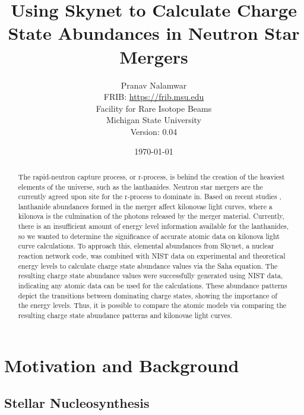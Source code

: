 \documentclass[11pt,a4paper]{article}
\begin{document}
\title{Using Skynet to Calculate Charge State Abundances in Neutron Star Mergers}

\author{Pranav Nalamwar\\FRIB: \url{https://frib.msu.edu}\\Facility for Rare Isotope Beams\\Michigan State University\\Version: 0.04} 
\date{\today}
\maketitle

\begin{abstract}

The rapid-neutron capture process, or r-process, is behind the creation of the heaviest elements of the universe, such as the lanthanides. Neutron star mergers are the currently agreed upon site for the r-process to dominate in. Based on recent studies \cite{2017Natur.551...80K} , lanthanide abundances formed in the merger affect kilonovae light curves, where a kilonova is the culmination of the photons released by the merger material. Currently, there is an insufficient amount of energy level information available for the lanthanides, so we wanted to determine the significance of accurate atomic data on kilonova light curve calculations. To approach this, elemental abundances from Skynet, a nuclear reaction network code, was combined with NIST data on experimental and theoretical energy levels to calculate charge state abundance values via the Saha equation. The resulting charge state abundance values were successfully generated using NIST data, indicating any atomic data can be used for the calculations. These abundance patterns depict the transitions between dominating charge states, showing the importance of the energy levels. Thus, it is possible to compare the atomic models via comparing the resulting charge state abundance patterns and kilonovae light curves. 

\end{abstract}

\tableofcontents

\section{Motivation and Background}

\subsection{Stellar Nucleosynthesis}
\end{document}
